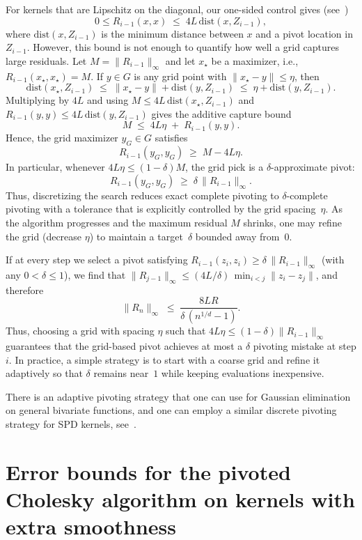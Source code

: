 \documentclass{amsart}
\theoremstyle{definition}
\theoremstyle{remark}
\begin{document}
For kernels that are Lipschitz on the diagonal, our one-sided control gives (see~)
\[
0\le R_{i-1}(x,x)\;\le\;4L\,\mathrm{dist}(x,Z_{i-1}),
\]
where $\mathrm{dist}(x,Z_{i-1})$ is the minimum distance between $x$ and a pivot location in $Z_{i-1}$. However, this bound is not enough to quantify how well a grid captures large residuals. Let $M=\|R_{i-1}\|_\infty$ and let $x_\star$ be a maximizer, i.e., $R_{i-1}(x_\star,x_\star)=M$. If $y\in G$ is any grid point with $\|x_\star-y\|\le\eta$, then
\[
\mathrm{dist}(x_\star,Z_{i-1})
\;\le\;\|x_\star-y\|+\mathrm{dist}(y,Z_{i-1})
\;\le\;\eta+\mathrm{dist}(y,Z_{i-1}).
\]
Multiplying by $4L$ and using $M\le 4L\,\mathrm{dist}(x_\star,Z_{i-1})$ and $R_{i-1}(y,y)\le 4L\,\mathrm{dist}(y,Z_{i-1})$ gives the additive capture bound
\[
M \;\le\; 4L\eta \;+\; R_{i-1}(y,y).
\]
Hence, the grid maximizer $y_G\in G$ satisfies
\[
R_{i-1}(y_G,y_G)\;\ge\; M-4L\eta.
\]
In particular, whenever $4L\eta\le (1-\delta)M$, the grid pick is a \(\delta\)-approximate pivot:
\[
R_{i-1}(y_G,y_G)\;\ge\;\delta\,\|R_{i-1}\|_\infty.
\]
Thus, discretizing the search reduces exact complete pivoting to $\delta$-complete pivoting with a tolerance that is explicitly controlled by the grid spacing~$\eta$. As the algorithm progresses and the maximum residual $M$ shrinks, one may refine the grid (decrease $\eta$) to maintain a target~$\delta$ bounded away from~$0$.

If at every step we select a pivot satisfying 
\(
R_{i-1}(z_i,z_i)\ge \delta\,\|R_{i-1}\|_\infty
\)
(with any $0<\delta\le 1$), we find that 
\(
\|R_{j-1}\|_\infty \le (4L/\delta)\,\min_{i<j}\|z_i-z_j\|
\),
and therefore
\[
\|R_n\|_\infty \;\le\; \frac{8 L R}{\delta\,(n^{1/d}-1)}.
\]
Thus, choosing a grid with spacing $\eta$ such that $4L\eta\le (1-\delta)\|R_{i-1}\|_\infty$ guarantees that the grid-based pivot achieves at most a $\delta$ pivoting mistake at step $i$. In practice, a simple strategy is to start with a coarse grid and refine it adaptively so that $\delta$ remains near~$1$ while keeping evaluations inexpensive.  

There is an adaptive pivoting strategy that one can use for Gaussian elimination on general bivariate functions, and one can employ a similar discrete pivoting strategy for SPD kernels, see~\cite{townsend2013extension}. 

\section{Error bounds for the pivoted Cholesky algorithm on kernels with extra smoothness}\label{sec:generalsmooth}
\end{document}
